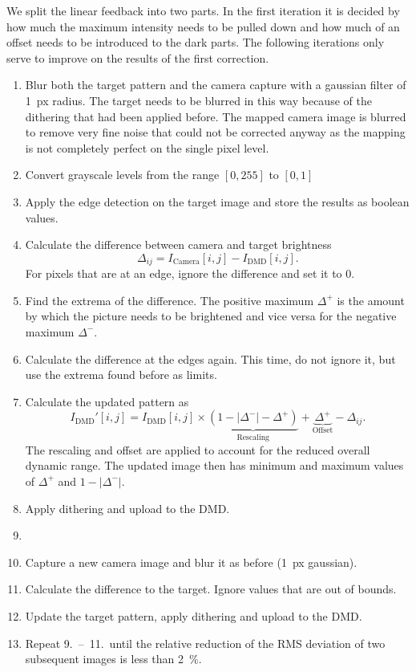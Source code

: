 \noindent
We split the linear feedback into two parts. In the first iteration it is decided by how much the maximum intensity needs to be pulled down and how much of an offset needs to be introduced to the dark parts. The following iterations only serve to improve on the results of the first correction.
%
\begin{enumerate}
    \item Blur both the target pattern and the camera capture with a gaussian filter of \SI{1}{px} radius. The target needs to be blurred in this way because of the dithering that had been applied before. The mapped camera image is blurred to remove very fine noise that could not be corrected anyway as the mapping is not completely perfect on the single pixel level.
    \item Convert grayscale levels from the range $[0,255]$ to $[0,1]$
    \item Apply the edge detection on the target image and store the results as boolean values.
    \item Calculate the difference between camera and target brightness \[\Delta_{ij} = I_\text{Camera}[i,j] - I_\text{DMD}[i,j].\] For pixels that are at an edge, ignore the difference and set it to 0.
    \item Find the extrema of the difference. The positive maximum $\Delta^+$ is the amount by which the picture needs to be brightened and vice versa for the negative maximum $\Delta^-$. 
    \item Calculate the difference at the edges again. This time, do not ignore it, but use the extrema found before as limits.
    \item Calculate the updated pattern as \[I_\text{DMD}'[i,j] = I_\text{DMD}[i,j]\times \underbrace{(1- | \Delta^- | - \Delta^+)}_{\text{Rescaling}} + \underbrace{\Delta^+}_{\text{Offset}} - \Delta_{ij}. \] The rescaling and offset are applied to account for the reduced overall dynamic range. The updated image then has minimum and maximum values of $\Delta^+$ and $1 - |\Delta^-|$.
    \item Apply dithering and upload to the DMD.
    \item[] 
    \item Capture a new camera image and blur it as before (\SI{1}{px} gaussian).
    \item Calculate the difference to the target. Ignore values that are out of bounds.
    \item Update the target pattern, apply dithering and upload to the DMD.
    \item Repeat 9.~--~11.\ until the relative reduction of the RMS deviation of two subsequent images is less than \SI{2}{\percent}.
\end{enumerate}


